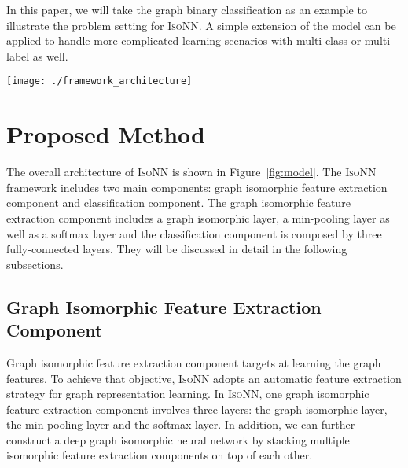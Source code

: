 \documentclass{article} \usepackage{iclr2020_conference,times}
\newcommand{\our}{\textsc{IsoNN}}
\begin{document}
In this paper, we will take the graph binary classification as an example to illustrate the problem setting for {\our}. A simple extension of the model can be applied to handle more complicated learning scenarios with multi-class or multi-label as well.


 \begin{figure*}
\vspace*{-20pt}
    \centering
    \hspace*{-1.5cm}
    \texttt{[image: ./framework\_architecture]}
    \vspace{-25pt}
    \caption{IsoNN Framework Architecture. (The left subplot provides the outline of the proposed framework, including the \textit{graph isomorphic feature extraction} component and the \textit{classification} component respectively. Meanwhile, the right subplot illustrates the detailed architecture of the proposed framework, where the \textit{graph isomorphic features} are extracted with the \textit{graph isomorphic layer}, \textit{min-pooling layer} and \textit{softmax layer}, and the graphs are further classified with three fully-connected layers.)} 
    \label{fig:model}
    \vspace*{-15pt}
\end{figure*} 


\vspace*{-10pt}
\section{Proposed Method}\label{sec:method}
\vspace*{-8pt}
The overall architecture of {\our} is shown in Figure~\ref{fig:model}. The {\our} framework includes two main components: graph isomorphic feature extraction component and classification component. The graph isomorphic feature extraction component includes a graph isomorphic layer, a min-pooling layer as well as a softmax layer and the classification component is composed by three fully-connected layers. They will be discussed in detail in the following subsections.
\vspace*{-5pt}
\subsection{Graph Isomorphic Feature Extraction Component}
\vspace*{-5pt}

Graph isomorphic feature extraction component targets at learning the graph features. To achieve that objective, {\our} adopts an automatic feature extraction strategy for graph representation learning. In {\our}, one graph isomorphic feature extraction component involves three layers: the graph isomorphic layer, the min-pooling layer and the softmax layer. In addition, we can further construct a deep graph isomorphic neural network by stacking multiple isomorphic feature extraction components on top of each other.
\end{document}
